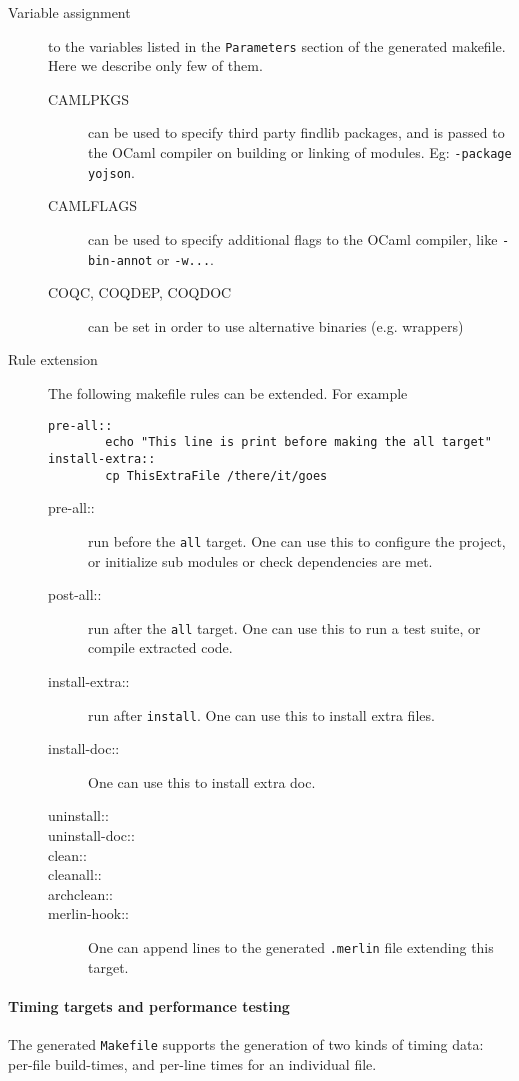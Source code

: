\begin{description}
  \item[Variable assignment] to the variables listed in the {\tt Parameters}
	  section of the generated makefile.  Here we describe only few of them.
  \begin{description}
  \item[CAMLPKGS] can be used to specify third party findlib packages, and is
	  passed to the OCaml compiler on building or linking of modules.
          Eg: {\tt -package yojson}.
  \item[CAMLFLAGS] can be used to specify additional flags to the OCaml
	  compiler, like {\tt -bin-annot} or {\tt -w...}.
  \item[COQC, COQDEP, COQDOC] can be set in order to use alternative 
	  binaries (e.g. wrappers)
  \end{description}
\item[Rule extension]
  The following makefile rules can be extended. For example
\begin{verbatim}
pre-all::
        echo "This line is print before making the all target"
install-extra::
        cp ThisExtraFile /there/it/goes
\end{verbatim}
  \begin{description}
  \item[pre-all::] run before the {\tt all} target.  One can use this
	  to configure the project, or initialize sub modules or check
	  dependencies are met.
  \item[post-all::] run after the {\tt all} target.  One can use this
	  to run a test suite, or compile extracted code.
  \item[install-extra::] run after {\tt install}.  One can use this
	  to install extra files.
  \item[install-doc::]  One can use this to install extra doc.
  \item[uninstall::] 
  \item[uninstall-doc::]
  \item[clean::]
  \item[cleanall::]
  \item[archclean::]
  \item[merlin-hook::] One can append lines to the generated {\tt .merlin}
	  file extending this target.
  \end{description}
\end{description}

\paragraph{Timing targets and performance testing} %
The generated \texttt{Makefile} supports the generation of two kinds
of timing data: per-file build-times, and per-line times for an
individual file.

